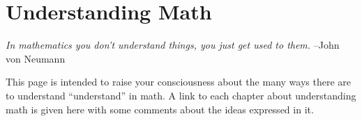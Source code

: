 \section*{Understanding Math}
    \textit{In mathematics you don’t understand things, you just get used to them.}
    –John von Neumann

    This page is intended to raise your consciousness about the many ways there are
    to understand “understand” in math. A link to each chapter about understanding
    math is given here with some comments about the ideas expressed in it.
